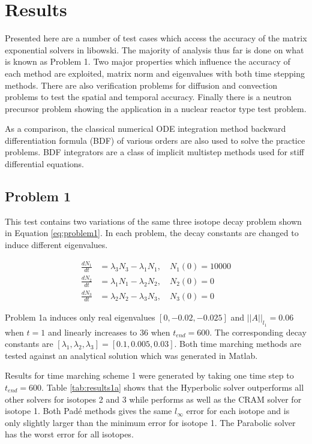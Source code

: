 \chapter{Results}\label{ch:results}
Presented here are a number of test cases which access the accuracy of the matrix exponential solvers in libowski. The majority of analysis thus far is done on what is known as Problem 1. Two major properties which influence the accuracy of each method are exploited, matrix norm and eigenvalues with both time stepping methods. There are also verification problems for diffusion and convection problems to test the spatial and temporal accuracy. Finally there is a neutron precursor problem showing the application in a nuclear reactor type test problem. 

As a comparison, the classical numerical ODE integration method backward differentiation formula (BDF) of various orders are also used to solve the practice problems. BDF integrators are a class of implicit multistep methods used for stiff differential equations. 

\section{Problem 1}
This test contains two variations of the same three isotope decay problem shown in Equation \ref{eq:problem1}. In each problem, the decay constants are changed to induce different eigenvalues.

\begin{equation}
\begin{split}
    \frac{dN_{1}}{dt} &= \lambda_{3}N_{3} - \lambda_{1}N_{1}, \quad N_{1}(0) = 10000\\
    \frac{dN_{2}}{dt} &= \lambda_{1}N_{1} - \lambda_{2}N_{2}, \quad N_{2}(0) = 0\\
    \frac{dN_{3}}{dt} &= \lambda_{2}N_{2} - \lambda_{3}N_{3}, \quad N_{3}(0) = 0
\end{split}
    \label{eq:problem1}
\end{equation}

Problem 1a induces only real eigenvalues $[0, -0.02, -0.025]$ and $||A||_{l_{1}} =0.06$ when $t=1$ and linearly increases to $36$ when $t_{end}=600$. The corresponding decay constants are $[\lambda_{1}, \lambda_{2}, \lambda_{3}] = [0.1, 0.005, 0.03]$. Both time marching methods are tested against an analytical solution which was generated in Matlab. 


Results for time marching scheme 1 were generated by taking one time step to $t_{end} = 600$. Table \ref{tab:results1a} shows that the Hyperbolic solver outperforms all other solvers for isotopes 2 and 3 while performs as well as the CRAM solver for isotope 1. Both Pad\'e methods gives the same $l_{\infty}$ error for each isotope and is only slightly larger than the minimum error for isotope 1. The Parabolic solver has the worst error for all isotopes. 

